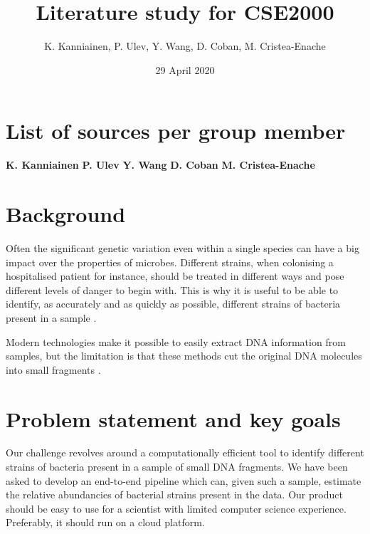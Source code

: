 \documentclass{article}
\title{Literature study for CSE2000}
\author{K. Kanniainen, P. Ulev, Y. Wang, D. Coban, M. Cristea-Enache}
\date{29 April 2020}
\begin{document}
\maketitle

\section*{List of sources per group member}

\textbf{K. Kanniainen} \cite{mpgprimer} \cite{jellyfish} \cite{wdl} \cite{snakemake} \cite{mbs:/content/journal/mgen/10.1099/mgen.0.000075}
\newline
\newline
\textbf{P. Ulev} \cite{gatk} \cite{dimensions} \cite{tang_2016} \cite{MEGA6} \cite{bitSeq}
\newline
\newline
\textbf{Y. Wang}\cite{StrainEst}\cite{Mash}\cite{Ipopt}\cite{Bowtie}\cite{MUMmer}
\newline
\newline
\textbf{D. Coban} \cite{7030212} \cite{terra.bio} \cite{broad-institute} \cite{progressive} \cite{wall_kudtarkar_fusaro_pivovarov_patil_tonellato_2010}
\newline
\newline
\textbf{M. Cristea-Enache} \cite{roosaare2017strainseeker} \cite{ahn2015sigma} \cite{teeling2004tetra} \cite{fiannaca2018deep} \cite{sezerman_ulgen_seymen_durasi_2019}

\section{Background}
Often the significant genetic variation even within a single species can have a big impact over the properties of microbes. Different strains, when colonising a hospitalised patient for instance, should be treated in different ways and pose different levels of danger to begin with. This is why it is useful to be able to identify, as accurately and as quickly as possible, different strains of bacteria present in a sample \cite{mbs:/content/journal/mgen/10.1099/mgen.0.000075}. 

Modern technologies make it possible to easily extract DNA information from samples, but the limitation is that these methods cut the original DNA molecules into small fragments \cite{mpgprimer}.

\section{Problem statement and key goals}
Our challenge revolves around a computationally efficient tool to identify different strains of bacteria present in a sample of small DNA fragments. We have been asked to develop an end-to-end pipeline which can, given such a sample, estimate the relative abundancies of bacterial strains present in the data. Our product should be easy to use for a scientist with limited computer science experience. Preferably, it should run on a cloud platform.
\end{document}
